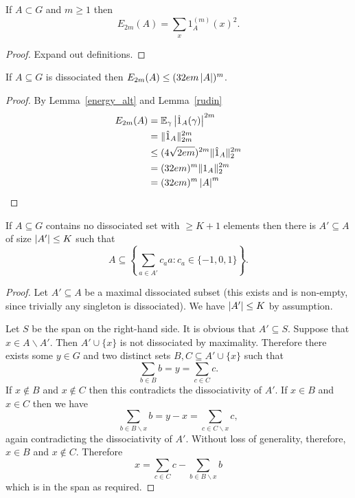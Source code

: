 \begin{lemma}
\label{energy_alt}
\leanok
If $A\subset G$ and $m\geq 1$ then
\[E_{2m}(A) = \sum_x 1_A^{(m)}(x)^2.\]
\end{lemma}

\begin{proof}
\leanok
Expand out definitions.
\end{proof}


\begin{lemma}
\label{diss_energy}
\leanok
If $A\subseteq G$ is dissociated then $E_{2m}(A) \leq (32e m \left\lvert A\right\rvert)^m$.
\end{lemma}
\begin{proof}
\leanok
By Lemma~\ref{energy_alt} and Lemma~\ref{rudin}
\begin{align*}
  E_{2m}(A)
  & = \mathbb{E}_\gamma \left\lvert \hat 1_A(\gamma)\right\rvert^{2m} \\
  & = \lVert \hat 1_A\rVert_{2m}^{2m} \\
  & \le (4\sqrt{2em})^{2m} \lVert \hat 1_A\rVert_2^{2m} \\
  & = (32em)^m \lVert 1_A\rVert_2^{2m} \\
  & = (32em)^m \left\lvert A\right\rvert^m
\end{align*}
\end{proof}


\begin{lemma}
\label{diss_span}
\leanok
If $A\subseteq G$ contains no dissociated set with $\geq K+1$ elements then there is $A'\subseteq A$ of size $\left\lvert A'\right\rvert\leq K$ such that
\[A\subseteq \left\{ \sum_{a\in A'}c_aa : c_a\in \{-1,0,1\} \right\}.\]
\end{lemma}

\begin{proof}
\leanok
Let $A'\subseteq A$ be a maximal dissociated subset (this exists and is non-empty, since trivially any singleton is dissociated). We have $\left\lvert A'\right\rvert\leq K$ by assumption.

Let $S$ be the span on the right-hand side. It is obvious that $A'\subseteq S$. Suppose that $x\in A\backslash A'$. Then $A'\cup\{x\}$ is not dissociated by maximality. Therefore there exists some $y\in G$ and two distinct sets $B,C\subseteq A'\cup \{x\}$ such that
\[\sum_{b\in B}b = y = \sum_{c\in C} c.\]
If $x\not\in B$ and $x\not\in C$ then this contradicts the dissociativity of $A'$. If $x\in B$ and $x\in C$ then we have
\[\sum_{b\in B\backslash x}b=y-x=\sum_{c\in C\backslash x}c,\]
again contradicting the dissociativity of $A'$. Without loss of generality, therefore, $x\in B$ and $x\not\in C$. Therefore
\[x=\sum_{c\in C}c - \sum_{b\in B\backslash x}b\]
which is in the span as required.
\end{proof}


